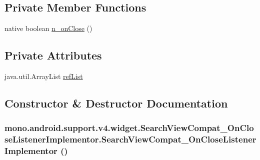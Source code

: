 \subsection*{Private Member Functions}
\begin{CompactItemize}
\item 
native boolean \hyperlink{classmono_1_1android_1_1support_1_1v4_1_1widget_1_1_search_view_compat___on_close_listener_implementor_926793821a0dd6c39e068c4e805a752b}{n\_\-onClose} ()
\end{CompactItemize}
\subsection*{Private Attributes}
\begin{CompactItemize}
\item 
java.util.ArrayList \hyperlink{classmono_1_1android_1_1support_1_1v4_1_1widget_1_1_search_view_compat___on_close_listener_implementor_a9871fadc765ef12272ab9dc2659565c}{refList}
\end{CompactItemize}


\subsection{Constructor \& Destructor Documentation}
\hypertarget{classmono_1_1android_1_1support_1_1v4_1_1widget_1_1_search_view_compat___on_close_listener_implementor_06ae1e4594a8753a73417782696ce42f}{
\subsubsection[{SearchViewCompat\_\-OnCloseListenerImplementor}]{\setlength{\rightskip}{0pt plus 5cm}mono.android.support.v4.widget.SearchViewCompat\_\-OnCloseListenerImplementor.SearchViewCompat\_\-OnCloseListenerImplementor ()}}
\label{classmono_1_1android_1_1support_1_1v4_1_1widget_1_1_search_view_compat___on_close_listener_implementor_06ae1e4594a8753a73417782696ce42f}




